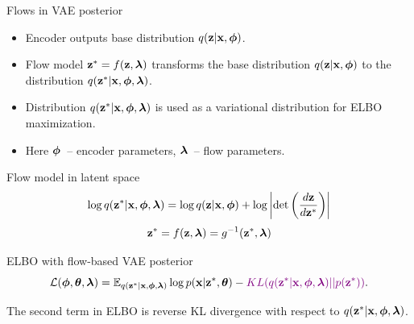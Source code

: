 \begin{frame}{Flows in VAE posterior}
	\begin{itemize}
		\item Encoder outputs base distribution $q(\mathbf{z} | \mathbf{x}, \boldsymbol{\phi})$.
		\item Flow model $\mathbf{z}^* = f(\mathbf{z}, \boldsymbol{\lambda})$ transforms the base distribution $q(\mathbf{z} | \mathbf{x}, \boldsymbol{\phi})$ to the distribution $q(\mathbf{z}^* | \mathbf{x}, \boldsymbol{\phi}, \boldsymbol{\lambda})$.
		\item Distribution $q(\mathbf{z}^* | \mathbf{x}, \boldsymbol{\phi}, \boldsymbol{\lambda})$ is used as a variational distribution for ELBO maximization. 
		\item Here $\boldsymbol{\phi}$~-- encoder parameters, $\boldsymbol{\lambda}$~-- flow parameters.
	\end{itemize}
	\begin{block}{Flow model in latent space}
		\vspace{-0.5cm}
		\[
		\log q(\mathbf{z}^* | \mathbf{x}, \boldsymbol{\phi}, \boldsymbol{\lambda}) = \log q(\mathbf{z} | \mathbf{x}, \boldsymbol{\phi}) + \log \left | \det \left( \frac{d \mathbf{z}}{d \mathbf{z}^*}\right) \right|
		\]
		\vspace{-0.3cm}
		\[
		\mathbf{z}^* = f(\mathbf{z}, \boldsymbol{\lambda}) = g^{-1}(\mathbf{z}^*, \boldsymbol{\lambda})
		\]
		\vspace{-0.7cm}
	\end{block}
	\begin{block}{ELBO with flow-based VAE posterior}
		\vspace{-0.6cm}
		\[
		\mathcal{L} (\boldsymbol{\phi}, \boldsymbol{\theta}, \boldsymbol{\lambda}) =  \mathbb{E}_{q(\mathbf{z}^* | \mathbf{x}, \boldsymbol{\phi}, \boldsymbol{\lambda})} \log p(\mathbf{x} | \mathbf{z}^*, \boldsymbol{\theta}) - {\color{violet}KL (q(\mathbf{z}^* | \mathbf{x}, \boldsymbol{\phi}, \boldsymbol{\lambda}) || p(\mathbf{z}^*))}.
		\]
		\vspace{-0.6cm}
	\end{block}
	{\color{violet}The second term} in ELBO is reverse KL divergence with respect to $q(\mathbf{z}^* | \mathbf{x}, \boldsymbol{\phi}, \boldsymbol{\lambda})$.
	
\end{frame}
